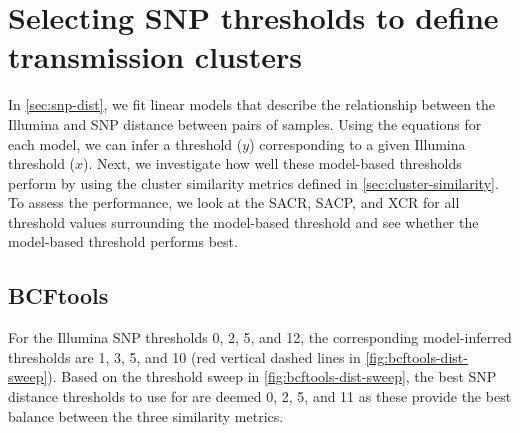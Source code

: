 
\section{Selecting \ont{} SNP thresholds to define transmission clusters}
\label{app:dist-sweep}

In \autoref{sec:snp-dist}, we fit linear models that describe the relationship between the Illumina and \ont{} SNP distance between pairs of samples. Using the equations for each model, we can infer a \ont{} threshold ($y$) corresponding to a given Illumina threshold ($x$). Next, we investigate how well these model-based thresholds perform by using the cluster similarity metrics defined in \autoref{sec:cluster-similarity}. To assess the performance, we look at the SACR, SACP, and XCR for all threshold values surrounding the model-based threshold and see whether the model-based threshold performs best.

\subsection{BCFtools}

For the Illumina SNP thresholds 0, 2, 5, and 12, the corresponding \bcftools{} model-inferred thresholds are 1, 3, 5, and 10 (red vertical dashed lines in \autoref{fig:bcftools-dist-sweep}). Based on the threshold sweep in \autoref{fig:bcftools-dist-sweep}, the best SNP distance thresholds to use for \bcftools{} are deemed 0, 2, 5, and 11 as these provide the best balance between the three similarity metrics.

